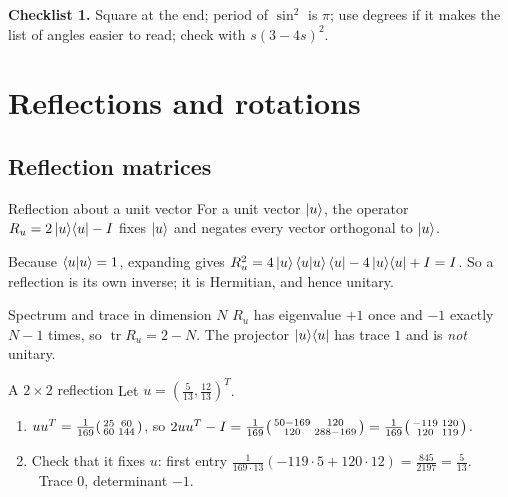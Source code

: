 \documentclass[11pt,a4paper,openany]{book}
\newcounter{wex}[section]
\newenvironment{steps}{\begin{enumerate}[label=\textbf{Step \arabic*.}, leftmargin=4.2em, itemsep=2pt]}{\end{enumerate}}
\newcommand{\proj}[1]{\ket{#1}\!\bra{#1}}
\begin{document}
\textbf{Checklist 1.} Square at the end; period of $\sin^2$ is $\pi$; use degrees if it makes the list of angles easier to read; check with $s(3 - 4s)^2$.

\section{Reflections and rotations}
\subsection{Reflection matrices}
\begin{defn}{Reflection about a unit vector}
For a unit vector $\ket{u}$, the operator $R_u = 2\proj{u} - I$ fixes $\ket{u}$ and negates every vector orthogonal to $\ket{u}$.
\end{defn}
Because $\braket{u|u} = 1$, expanding gives $R_u^2 = 4\ket{u}\braket{u|u}\bra{u} - 4\proj{u} + I = I$. So a reflection is its own inverse; it is Hermitian, and hence unitary.
\begin{keyres}{Spectrum and trace in dimension $N$}
$R_u$ has eigenvalue $+1$ once and $-1$ exactly $N - 1$ times, so $\operatorname{tr} R_u = 2 - N$. The projector $\proj{u}$ has trace $1$ and is \emph{not} unitary.
\end{keyres}

\begin{wexample}{A $2\times2$ reflection}
Let $u = (\frac{5}{13}, \frac{12}{13})^{T}$.
\begin{steps}
\item $uu^{T} = \frac{1}{169}\begin{psmallmatrix}25&60\\60&144\end{psmallmatrix}$, so $2uu^{T} - I = \frac{1}{169}\begin{psmallmatrix}50 - 169 & 120\\ 120 & 288 - 169\end{psmallmatrix} = \frac{1}{169}\begin{psmallmatrix}-119 & 120\\ 120 & 119\end{psmallmatrix}$.
\item Check that it fixes $u$: first entry $\frac{1}{169\cdot13}(-119\cdot5 + 120\cdot12) = \frac{845}{2197} = \frac{5}{13}$. \checkmark\ Trace $0$, determinant $-1$.
\end{steps}
\end{wexample}
\end{document}
